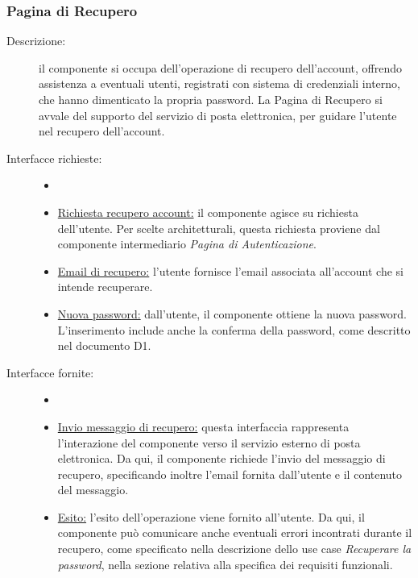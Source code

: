 \documentclass[11pt, a4paper]{article}
\theoremstyle{definition} %
\begin{document}
\subsubsection{Pagina di Recupero}
\begin{description}
    \item[Descrizione:] il componente si occupa dell'operazione
    di recupero dell'account, offrendo assistenza a eventuali utenti,
    registrati con sistema di credenziali interno, che hanno dimenticato
    la propria password. La Pagina di Recupero si avvale del supporto
    del servizio di posta elettronica, per guidare l'utente nel recupero
    dell'account.

    \item[Interfacce richieste:]
    \begin{itemize}
        \item[]

        \item \underline{Richiesta recupero account:} il componente
        agisce su richiesta dell'utente. Per scelte architetturali,
        questa richiesta proviene dal componente intermediario
        \textit{Pagina di Autenticazione}.

        \item \underline{Email di recupero:} l'utente fornisce l'email
        associata all'account che si intende recuperare.

        \item \underline{Nuova password:} dall'utente, il componente
        ottiene la nuova password. L'inserimento include anche la
        conferma della password, come descritto nel documento D1.
    \end{itemize}

    \item[Interfacce fornite:]
    \begin{itemize}
        \item[]

        \item \underline{Invio messaggio di recupero:} questa interfaccia
        rappresenta l'interazione del componente verso
        il servizio esterno di posta elettronica. Da qui, il
        componente richiede l'invio del messaggio di recupero,
        specificando inoltre l'email fornita dall'utente e il
        contenuto del messaggio.

        \item \underline{Esito:} l'esito dell'operazione viene
        fornito all'utente. Da qui, il componente può comunicare
        anche eventuali errori incontrati durante il recupero,
        come specificato nella descrizione dello use case
        \textit{Recuperare la password}, nella sezione relativa
        alla specifica dei requisiti funzionali.


\end{itemize}
\end{description}
\end{document}
